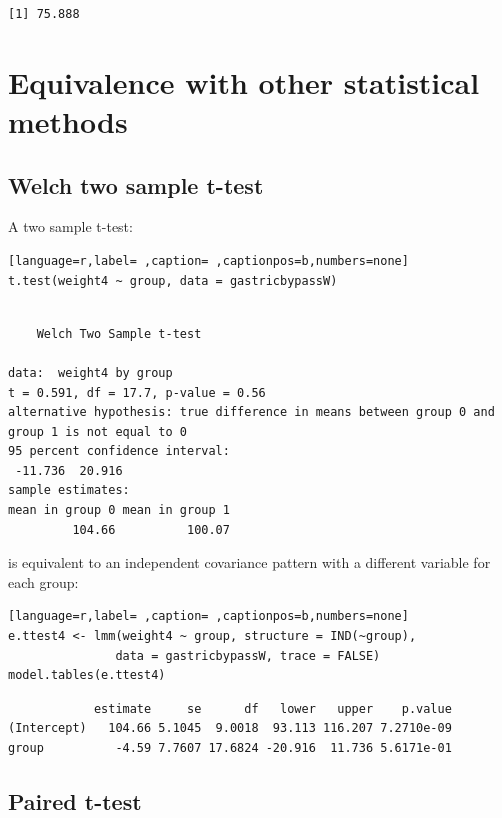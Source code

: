 \documentclass[12pt]{article}
\begin{document}
\begin{verbatim}
[1] 75.888
\end{verbatim}



\clearpage

\section{Equivalence with other statistical methods}
\label{sec:org106f897}
\subsection{Welch two sample t-test}
\label{sec:org0284e74}

A two sample t-test:
\begin{lstlisting}[language=r,label= ,caption= ,captionpos=b,numbers=none]
t.test(weight4 ~ group, data = gastricbypassW)
\end{lstlisting}

\begin{verbatim}

	Welch Two Sample t-test

data:  weight4 by group
t = 0.591, df = 17.7, p-value = 0.56
alternative hypothesis: true difference in means between group 0 and group 1 is not equal to 0
95 percent confidence interval:
 -11.736  20.916
sample estimates:
mean in group 0 mean in group 1 
         104.66          100.07
\end{verbatim}

is equivalent to an independent covariance pattern with a different
variable for each group:
\begin{lstlisting}[language=r,label= ,caption= ,captionpos=b,numbers=none]
e.ttest4 <- lmm(weight4 ~ group, structure = IND(~group), 
               data = gastricbypassW, trace = FALSE)
model.tables(e.ttest4)
\end{lstlisting}

\begin{verbatim}
            estimate     se      df   lower   upper    p.value
(Intercept)   104.66 5.1045  9.0018  93.113 116.207 7.2710e-09
group          -4.59 7.7607 17.6824 -20.916  11.736 5.6171e-01
\end{verbatim}


\clearpage

\subsection{Paired t-test}
\label{sec:org9d905c8}
\end{document}
